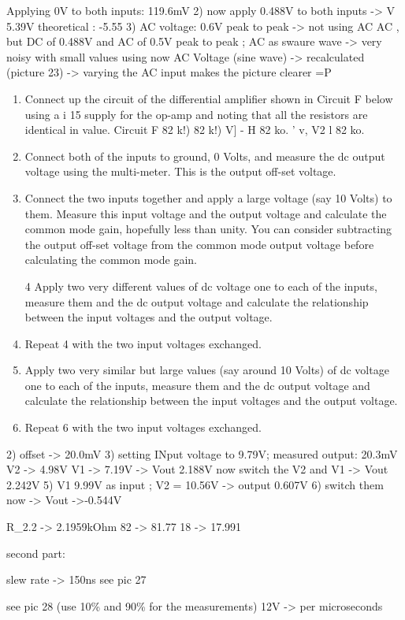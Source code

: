 Applying 0V to both inputs: 119.6mV
2) now apply  0.488V to both inputs -> V 5.39V
theoretical : -5.55
3) AC voltage: 0.6V peak to peak
-> not using AC AC , but DC of 0.488V and AC of 0.5V peak to peak ; AC as swaure wave
-> very noisy with small values
using now AC Voltage (sine wave) -> recalculated (picture 23) -> varying the AC input makes the picture clearer =P

\begin{enumerate}
	\item  Connect up the circuit of the differential amplifier shown in Circuit F below using a i 15
supply for the op-amp and noting that all the resistors are identical in value.
Circuit F 82 k!) 82 k!)
V] - H
82 ko. ' v,
V2
l 82 ko.

\item  Connect both of the inputs to ground, 0 Volts, and measure the dc output voltage using the
multi-meter. This is the output off-set voltage.

\item  Connect the two inputs together and apply a large voltage (say 10 Volts) to them. Measure
this input voltage and the output voltage and calculate the common mode gain, hopefully
less than unity. You can consider subtracting the output off-set voltage from the common
mode output voltage before calculating the common mode gain.

4 Apply two very different values of dc voltage one to each of the inputs, measure them and
the dc output voltage and calculate the relationship between the input voltages and the
output voltage.

\item  Repeat 4 with the two input voltages exchanged.

\item  Apply two very similar but large values (say around 10 Volts) of dc voltage one to each of
the inputs, measure them and the dc output voltage and calculate the relationship between
the input voltages and the output voltage.

\item  Repeat 6 with the two input voltages exchanged.
\end{enumerate}
2) offset -> 20.0mV
3) setting INput voltage to 9.79V; measured output: 20.3mV
V2 -> 4.98V
V1 -> 7.19V
-> Vout 2.188V
now switch the V2 and V1
-> Vout 2.242V
5) V1 9.99V as input ; V2 = 10.56V -> output 0.607V
6) switch them now -> Vout ->-0.544V



R_2.2 ->  2.1959kOhm
82 -> 81.77
18 -> 17.991

second part:


slew rate -> 150ns
see pic 27

see pic 28 (use 10\% and 90\% for the measurements)
12V -> per microseconds

